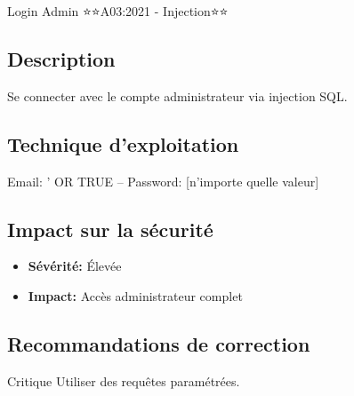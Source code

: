 \begin{vulnerability}{Login Admin ⭐⭐}{A03:2021 - Injection}{⭐⭐}
    \subsection*{Description}
    Se connecter avec le compte administrateur via injection SQL.
    
    \subsection*{Technique d'exploitation}
    \begin{payload}
Email: ' OR TRUE --
Password: [n'importe quelle valeur]
    \end{payload}
    
    \subsection*{Impact sur la sécurité}
    \begin{itemize}
        \item \textbf{Sévérité:} Élevée
        \item \textbf{Impact:} Accès administrateur complet
    \end{itemize}
    
    \subsection*{Recommandations de correction}
    \begin{recommendation}{Critique}
        Utiliser des requêtes paramétrées.
    \end{recommendation}
\end{vulnerability}

